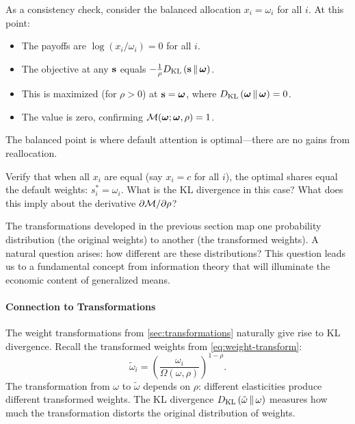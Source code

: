 As a consistency check, consider the balanced allocation $x_i = \omega_i$ for all $i$. At this point:
\begin{itemize}[nosep]
    \item The payoffs are $\log(x_i/\omega_i) = 0$ for all $i$.
    \item The objective at any $\mathbf{s}$ equals $-\frac{1}{\rho}D_{\mathrm{KL}}\left(\mathbf{s} \,\|\, \boldsymbol{\omega}\right)$.
    \item This is maximized (for $\rho > 0$) at $\mathbf{s} = \boldsymbol{\omega}$, where $D_{\mathrm{KL}}\left(\boldsymbol{\omega} \,\|\, \boldsymbol{\omega}\right) = 0$.
    \item The value is zero, confirming $\mathcal{M}(\boldsymbol{\omega}; \boldsymbol{\omega}, \rho) = 1$.
\end{itemize}

The balanced point is where default attention is optimal---there are no gains from reallocation.

\begin{callouttip}[Exercise]
Verify that when all $x_i$ are equal (say $x_i = c$ for all $i$), the optimal shares equal the default weights: $s_i^* = \omega_i$. What is the KL divergence in this case? What does this imply about the derivative $\partial \mathcal{M} / \partial \rho$?
\end{callouttip}

The transformations developed in the previous section map one probability distribution (the original weights) to another (the transformed weights). A natural question arises: how different are these distributions? This question leads us to a fundamental concept from information theory that will illuminate the economic content of generalized means.

\paragraph{Connection to Transformations}

The weight transformations from \cref{sec:transformations} naturally give rise to KL divergence. Recall the transformed weights from \cref{eq:weight-transform}:
\begin{equation}
\tilde{\omega}_i = \left( \frac{\omega_i}{\Omega(\omega, \rho)} \right)^{1-\rho}.
\end{equation}
The transformation from $\omega$ to $\tilde{\omega}$ depends on $\rho$: different elasticities produce different transformed weights. The KL divergence $D_{\mathrm{KL}}\left(\tilde{\omega} \,\|\, \omega\right)$ measures how much the transformation distorts the original distribution of weights.

